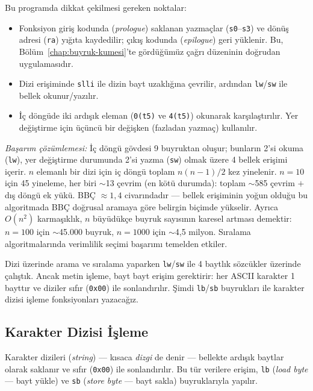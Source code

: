 \begin{ornek}[4.8]
Bu programda dikkat çekilmesi gereken noktalar:
\begin{itemize}
\item Fonksiyon giriş kodunda (\emph{prologue}) saklanan yazmaçlar (\texttt{s0}--\texttt{s3}) ve dönüş adresi (\texttt{ra}) yığıta kaydedilir; çıkış kodunda (\emph{epilogue}) geri yüklenir. Bu, Bölüm~\ref{chap:buyruk-kumesi}'te gördüğümüz çağrı düzeninin doğrudan uygulamasıdır.
\item Dizi erişiminde \texttt{slli} ile dizin bayt uzaklığına çevrilir, ardından \texttt{lw}/\texttt{sw} ile bellek okunur/yazılır.
\item İç döngüde iki ardışık eleman (\texttt{0(t5)} ve \texttt{4(t5)}) okunarak karşılaştırılır. Yer değiştirme için üçüncü bir değişken (fazladan yazmaç) kullanılır.
\end{itemize}

\emph{Başarım çözümlemesi:} İç döngü gövdesi 9 buyruktan oluşur; bunların 2'si okuma (\texttt{lw}), yer değiştirme durumunda 2'si yazma (\texttt{sw}) olmak üzere 4 bellek erişimi içerir. $n$ elemanlı bir dizi için iç döngü toplam $n(n-1)/2$ kez yinelenir. $n = 10$ için 45 yineleme, her biri $\sim$13 çevrim (en kötü durumda): toplam $\sim$585 çevrim $+$ dış döngü ek yükü. BBÇ $\approx 1{,}4$ civarındadır --- bellek erişiminin yoğun olduğu bu algoritmada BBÇ doğrusal aramaya göre belirgin biçimde yükselir. Ayrıca $O(n^2)$ karmaşıklık, $n$ büyüdükçe buyruk sayısının karesel artması demektir: $n = 100$ için $\sim$45.000 buyruk, $n = 1000$ için $\sim$4{,}5 milyon. Sıralama algoritmalarında verimlilik seçimi başarımı temelden etkiler.
\end{ornek}


Dizi üzerinde arama ve sıralama yaparken \texttt{lw}/\texttt{sw} ile 4 baytlık sözcükler üzerinde çalıştık. Ancak metin işleme, bayt bayt erişim gerektirir: her ASCII karakter 1 bayttır ve diziler sıfır (\texttt{0x00}) ile sonlandırılır. Şimdi \texttt{lb}/\texttt{sb} buyrukları ile karakter dizisi işleme fonksiyonları yazacağız.

\subsection{Karakter Dizisi İşleme}
\label{subsec:karakter-dizisi}

Karakter dizileri (\emph{string}) --- kısaca \emph{dizgi} de denir --- bellekte ardışık baytlar olarak saklanır ve sıfır (\texttt{0x00}) ile sonlandırılır. Bu tür verilere erişim, \texttt{lb} (\emph{load byte} --- bayt yükle) ve \texttt{sb} (\emph{store byte} --- bayt sakla) buyruklarıyla yapılır.

